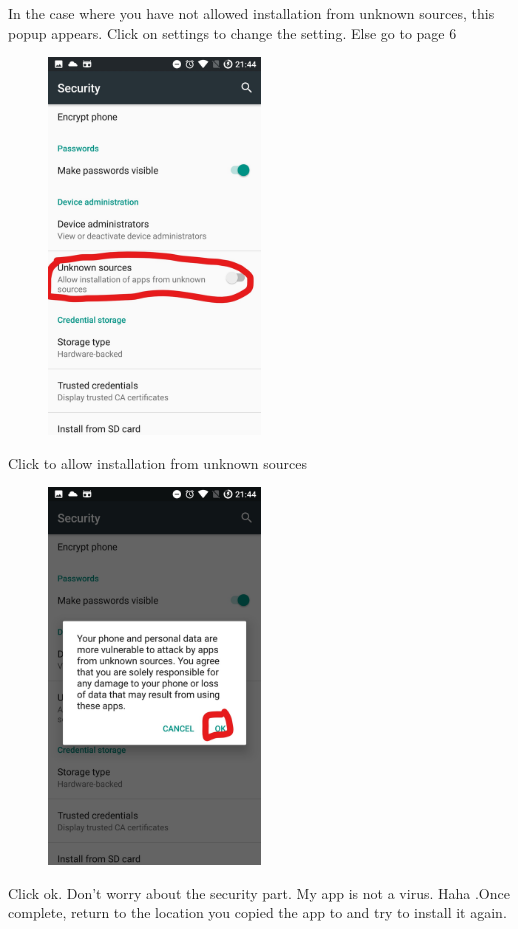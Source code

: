 \documentclass[fontsize=25pt]{scrbook}
\begin{document}
	In the case where you have not allowed installation from unknown sources,
	this popup appears. Click on settings to change the setting. Else go to page 6
	\newpage 
	\begin{center}
\begin{figure}
		\includegraphics[height=10cm]{Screenshot_3_LI.jpg}
		
		\end{figure}
	\end{center}
	Click to allow installation from unknown sources
	\newpage
	
	\begin{center}
\begin{figure}
		\includegraphics[height=10cm]{Screenshot_4_LI.jpg}
		
		\end{figure}
	\end{center}
	Click ok. Don't worry about the security part. My app is not a virus. Haha
	.Once complete, return to the location you copied the app to and try to install it again.
	
\end{document}
